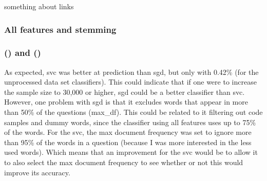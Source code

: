 something about links

\subsubsection{All features and stemming}





\subsubsection[SVC and SGD]{ () and  ()}
As expected, \gls{svc} was better at prediction than \gls{sgd}, but only with 0.42\% (for the unprocessed data set classifiers).
This could indicate that if one were to increase the sample size to 30,000 or higher, \gls{sgd} could be a better classifier than \gls{svc}.
However, one problem with \gls{sgd} is that it excludes words that appear in more than 50\% of the questions (max\_df). 
This could be related to it filtering out code samples and dummy words, since the classifier using all features uses up to 75\% of the words.
For the \gls{svc}, the max document frequency was set to ignore more than 95\% of the words in a question (because I was more interested in the less used words). 
Which means that an improvement for the \gls{svc} would be to allow it to also select the max document frequency to see whether or not this would improve its accuracy.


